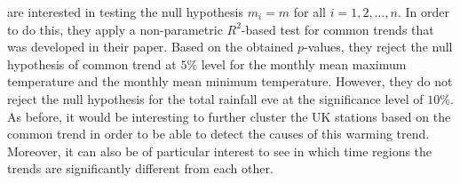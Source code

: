 \documentclass[a4paper,12pt]{article}
\begin{document}
\begin{itemize}[label=--,leftmargin=0.5cm]
\begin{example}
\cite{Zhang2012} are interested in testing the null hypothesis $m_i = m$ for all $i =1, 2, \ldots, n$. In order to do this, they apply a non-parametric $R^2$-based test for common trends that was developed in their paper. Based on the obtained $p$-values, they reject the null hypothesis of common trend at $5\%$ level for the monthly mean maximum temperature and the monthly mean minimum temperature. However,  they do not reject the null hypothesis for the total rainfall eve at the significance level of $10\%$. As before, it would be interesting to further cluster the UK stations based on the common trend in order to be able to detect the causes of this warming trend. Moreover, it can also be of particular interest to see in which time regions the trends are significantly different from each other.


\end{example}
\end{itemize}
\end{document}
